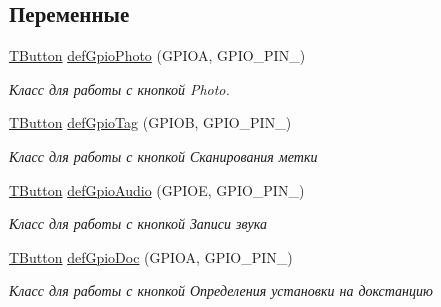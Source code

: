 \subsection*{Переменные}
\begin{DoxyCompactItemize}
\item 
\mbox{\label{namespaceapp_a1fe07c742b8bb8ae76b9010b45faa387}} 
\hyperlink{classapp_1_1_t_button}{T\+Button} \hyperlink{namespaceapp_a1fe07c742b8bb8ae76b9010b45faa387}{def\+Gpio\+Photo} (G\+P\+I\+OA, G\+P\+I\+O\+\_\+\+P\+I\+N\+\_)
\begin{DoxyCompactList}\small\item\em Класс для работы с кнопкой Photo. \end{DoxyCompactList}\item 
\mbox{\label{namespaceapp_ad7c10d3224ac5347743126941a346dc9}} 
\hyperlink{classapp_1_1_t_button}{T\+Button} \hyperlink{namespaceapp_ad7c10d3224ac5347743126941a346dc9}{def\+Gpio\+Tag} (G\+P\+I\+OB, G\+P\+I\+O\+\_\+\+P\+I\+N\+\_)
\begin{DoxyCompactList}\small\item\em Класс для работы с кнопкой Сканирования метки \end{DoxyCompactList}\item 
\mbox{\label{namespaceapp_aff8a04c420a6737e0a5d1639229ea0c9}} 
\hyperlink{classapp_1_1_t_button}{T\+Button} \hyperlink{namespaceapp_aff8a04c420a6737e0a5d1639229ea0c9}{def\+Gpio\+Audio} (G\+P\+I\+OE, G\+P\+I\+O\+\_\+\+P\+I\+N\+\_)
\begin{DoxyCompactList}\small\item\em Класс для работы с кнопкой Записи звука \end{DoxyCompactList}\item 
\mbox{\label{namespaceapp_a770bd3ea0ca638f222082cff1c2c6b65}} 
\hyperlink{classapp_1_1_t_button}{T\+Button} \hyperlink{namespaceapp_a770bd3ea0ca638f222082cff1c2c6b65}{def\+Gpio\+Doc} (G\+P\+I\+OA, G\+P\+I\+O\+\_\+\+P\+I\+N\+\_)
\begin{DoxyCompactList}\small\item\em Класс для работы с кнопкой Определения установки на докстанцию \end{DoxyCompactList}\item 
\mbox{\label{namespaceapp_a5d3e2252ee97a72dc9ab825375962ca1}} 

\end{DoxyCompactItemize}
